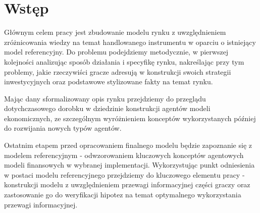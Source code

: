 \chapter*{Wstęp}

Głównym celem pracy jest zbudowanie modelu rynku z uwzględnieniem zróżnicowania wiedzy na temat handlowanego instrumentu w oparciu o istniejący model referencyjny. Do problemu podejdziemy metodycznie, w pierwszej kolejności analizując sposób działania i specyfikę rynku, nakreślając przy tym problemy, jakie rzeczywiści gracze adresują w konstrukcji swoich strategii inwestycyjnych oraz podstawowe stylizowane fakty na temat rynku.

Mając dany sformalizowany opis rynku przejdziemy do przeglądu dotychczasowego dorobku w dziedzinie konstrukcji agentów modeli ekonomicznych, ze szczególnym wyróżnieniem konceptów wykorzystanych później do rozwijania nowych typów agentów. 

Ostatnim etapem przed opracowaniem finalnego modelu będzie zapoznanie się z modelem referencyjnym - odwzorowaniem kluczowych konceptów agentowych modeli finansowych w wybranej implementacji. Wykorzystując punkt odniesienia w postaci modelu referencyjnego przejdziemy do kluczowego  elementu pracy - konstrukcji modelu z uwzględnieniem przewagi informacyjnej części graczy oraz zastosowanie go do weryfikacji hipotez na temat optymalnego wykorzystania przewagi informacyjnej.
